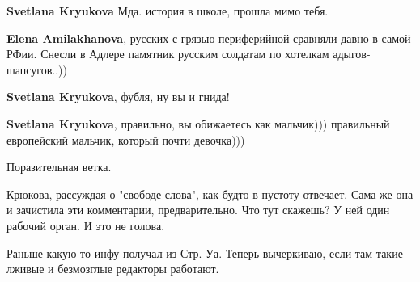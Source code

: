 \begin{itemize}
\begin{itemize}
 
\textbf{Svetlana Kryukova} Мда. история в школе, прошла мимо тебя.

 
\textbf{Elena Amilakhanova}, русских с грязью периферийной сравняли давно в самой РФии. Снесли в Адлере памятник русским солдатам по хотелкам адыгов-шапсугов..))

 
\textbf{Svetlana Kryukova}, фубля, ну вы и гнида!

 
\textbf{Svetlana Kryukova}, правильно, вы обижаетесь как мальчик))) правильный европейский мальчик, который почти девочка)))

 
Поразительная ветка.

Крюкова, рассуждая о "свободе слова", как будто в пустоту отвечает. Сама же она
и зачистила эти комментарии, предварительно. Что тут скажешь? У ней один
рабочий орган. И это не голова.

Раньше какую-то инфу получал из Стр. Уа. Теперь вычеркиваю, если там такие
лживые и безмозглые редакторы работают.

 

\end{itemize}
\end{itemize}
